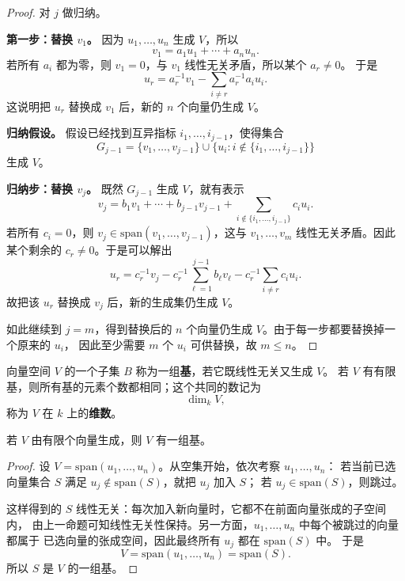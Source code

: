 \begin{proof}
对 $j$ 做归纳。

\textbf{第一步：替换 $v_1$。}
因为 $u_1,\dots,u_n$ 生成 $V$，所以
\[
  v_1 = a_1u_1+\cdots+a_nu_n.
\]
若所有 $a_i$ 都为零，则 $v_1=0$，与 $v_1$ 线性无关矛盾，所以某个 $a_r\neq 0$。
于是
\[
  u_r = a_r^{-1}v_1 - \sum_{i\neq r} a_r^{-1}a_i u_i.
\]
这说明把 $u_r$ 替换成 $v_1$ 后，新的 $n$ 个向量仍生成 $V$。

\textbf{归纳假设。}
假设已经找到互异指标 $i_1,\dots,i_{j-1}$，使得集合
\[
  G_{j-1} = \{v_1,\dots,v_{j-1}\}\cup \{u_i : i\notin \{i_1,\dots,i_{j-1}\}\}
\]
生成 $V$。

\textbf{归纳步：替换 $v_j$。}
既然 $G_{j-1}$ 生成 $V$，就有表示
\[
  v_j = b_1v_1+\cdots+b_{j-1}v_{j-1} + \sum_{i\notin\{i_1,\dots,i_{j-1}\}} c_i u_i.
\]
若所有 $c_i=0$，则 $v_j\in \mathrm{span}(v_1,\dots,v_{j-1})$，这与
$v_1,\dots,v_m$ 线性无关矛盾。因此某个剩余的 $c_r\neq 0$。于是可以解出
\[
  u_r = c_r^{-1}v_j - c_r^{-1}\sum_{\ell=1}^{j-1} b_\ell v_\ell
        - c_r^{-1}\sum_{i\neq r} c_i u_i.
\]
故把该 $u_r$ 替换成 $v_j$ 后，新的生成集仍生成 $V$。

如此继续到 $j=m$，得到替换后的 $n$ 个向量仍生成 $V$。由于每一步都要替换掉一个原来的 $u_i$，
因此至少需要 $m$ 个 $u_i$ 可供替换，故 $m\le n$。
\end{proof}

\begin{definition}[基与维数]
向量空间 $V$ 的一个子集 $B$ 称为一组\textbf{基}，若它既线性无关又生成 $V$。
若 $V$ 有有限基，则所有基的元素个数都相同；这个共同的数记为
\[
  \dim_k V,
\]
称为 $V$ 在 $k$ 上的\textbf{维数}。
\end{definition}

\begin{theorem}[有限生成向量空间有基]
若 $V$ 由有限个向量生成，则 $V$ 有一组基。
\end{theorem}

\begin{proof}
设 $V=\mathrm{span}(u_1,\dots,u_n)$。从空集开始，依次考察 $u_1,\dots,u_n$：
若当前已选向量集合 $S$ 满足 $u_j\notin \mathrm{span}(S)$，就把 $u_j$ 加入 $S$；
若 $u_j\in \mathrm{span}(S)$，则跳过。

这样得到的 $S$ 线性无关：每次加入新向量时，它都不在前面向量张成的子空间内，
由上一命题可知线性无关性保持。另一方面，$u_1,\dots,u_n$ 中每个被跳过的向量都属于
已选向量的张成空间，因此最终所有 $u_j$ 都在 $\mathrm{span}(S)$ 中。
于是
\[
  V=\mathrm{span}(u_1,\dots,u_n)=\mathrm{span}(S).
\]
所以 $S$ 是 $V$ 的一组基。
\end{proof}

